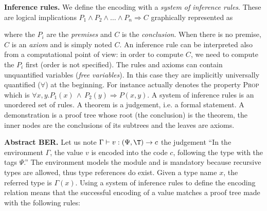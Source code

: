 \textbf{Inference rules.} We define the encoding with a \emph{system
of inference rules}. These are logical implications $P_1 \wedge P_2
\wedge \ldots \wedge P_n \Rightarrow C$ graphically represented as
\begin{mathpar}
\end{mathpar}
where the $P_i$ are the \emph{premises} and $C$ is the
\emph{conclusion}. When there is no premise, $C$ is an \emph{axiom}
and is simply noted $C$. An inference rule can be interpreted also
from a computational point of view: in order to compute $C$, we need
to compute the $P_i$ first (order is not specified). The rules and
axioms can contain unquantified variables (\emph{free variables}). In
this case they are implicitly universally quantified ($\forall$) at
the beginning. For instance
\; actually
denotes the property \textsc{Prop} which is $\forall x,y.P_1(x) \,
\wedge \, P_2(y) \Rightarrow P(x,y)$. A system of inference rules is
an unordered set of rules. A theorem is a judgement, i.e. a formal
statement. A demonstration is a proof tree whose root (the conclusion)
is the theorem, the inner nodes are the conclusions of its subtrees
and the leaves are axioms.

\medskip


\textbf{Abstract BER.} Let us note $\coding{\Gamma}{v}{(\Psi,\T)}{c}$
the judgement ``In the environment $\Gamma$, the value $v$ is encoded
into the code $c$, following the type \T{} with the tags $\Psi$.'' The
environment models the module and is mandatory because recursive types
are allowed, thus type references do exist. Given a type name $x$, the
referred type is $\Gamma(x)$. Using a system of inference rules to
define the encoding relation means that the successful encoding of a
value matches a proof tree made with the following rules:

